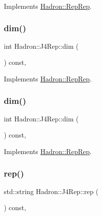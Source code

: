 Implements \mbox{\hyperlink{structHadron_1_1RepRep_a92c8802e5ed7afd7da43ccfd5b7cd92b}{Hadron\+::\+Rep\+Rep}}.

\mbox{\label{structHadron_1_1J4Rep_abd7390e1c86d4543ad991a7167f46615}} 
\subsubsection{\texorpdfstring{dim()}{dim()}\hspace{0.1cm}{\footnotesize\ttfamily [4/5]}}
{\footnotesize\ttfamily int Hadron\+::\+J4\+Rep\+::dim (\begin{DoxyParamCaption}{ }\end{DoxyParamCaption}) const\hspace{0.3cm}{\ttfamily [inline]}, {\ttfamily [virtual]}}



Implements \mbox{\hyperlink{structHadron_1_1RepRep_a92c8802e5ed7afd7da43ccfd5b7cd92b}{Hadron\+::\+Rep\+Rep}}.

\mbox{\label{structHadron_1_1J4Rep_abd7390e1c86d4543ad991a7167f46615}} 
\subsubsection{\texorpdfstring{dim()}{dim()}\hspace{0.1cm}{\footnotesize\ttfamily [5/5]}}
{\footnotesize\ttfamily int Hadron\+::\+J4\+Rep\+::dim (\begin{DoxyParamCaption}{ }\end{DoxyParamCaption}) const\hspace{0.3cm}{\ttfamily [inline]}, {\ttfamily [virtual]}}



Implements \mbox{\hyperlink{structHadron_1_1RepRep_a92c8802e5ed7afd7da43ccfd5b7cd92b}{Hadron\+::\+Rep\+Rep}}.

\mbox{\label{structHadron_1_1J4Rep_a2dcdb2a04a0f8207e99fffb770037b9e}} 
\subsubsection{\texorpdfstring{rep()}{rep()}\hspace{0.1cm}{\footnotesize\ttfamily [1/5]}}
{\footnotesize\ttfamily std\+::string Hadron\+::\+J4\+Rep\+::rep (\begin{DoxyParamCaption}{ }\end{DoxyParamCaption}) const\hspace{0.3cm}{\ttfamily [inline]}, {\ttfamily [virtual]}}



